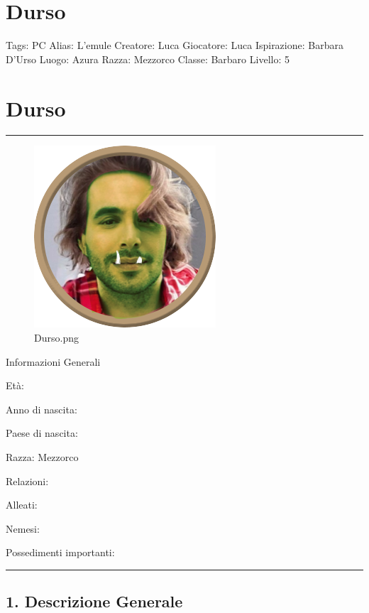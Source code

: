 \section{Durso}\label{durso}

Tags: PC Alias: L'emule Creatore: Luca Giocatore: Luca Ispirazione:
Barbara D'Urso Luogo: Azura Razza: Mezzorco Classe: Barbaro Livello: 5

\section{Durso}\label{durso-1}

\begin{center}\rule{0.5\linewidth}{0.5pt}\end{center}

\begin{figure}
\centering
\includegraphics{Durso.png}
\caption{Durso.png}
\end{figure}

Informazioni Generali

Età:

Anno di nascita:

Paese di nascita:

Razza: Mezzorco

Relazioni:

Alleati:

Nemesi:

Possedimenti importanti:

\begin{center}\rule{0.5\linewidth}{0.5pt}\end{center}

\subsection{1. Descrizione Generale}\label{descrizione-generale}


